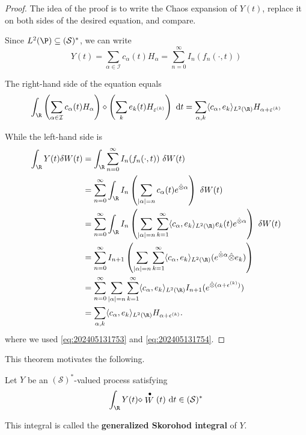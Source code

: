 \begin{proof}
The idea of the proof is to write the Chaos expansion of $Y(t)$, replace it on both sides of the desired equation, and compare.

Since $L^2(\P) \subseteq (\mathcal{S})^\ast$, we can write
\[
Y(t) = \sum_{\alpha \in \mathcal{I}} c_\alpha(t) H_\alpha = \sum_{n=0}^\infty I_n (f_n(\cdot, t))
\]

The right-hand side of the equation equals 
\[
\int_\R \left( \sum_{\alpha \in \mathcal{I}} c_\alpha(t) H_\alpha \right) \diamond \left( \sum_{k} e_k(t) H_{\varepsilon^{(k)}} \right) ~\mathrm{d}t = \sum_{\alpha, k} \langle c_\alpha, e_k \rangle_{L^2(\R)} H_{\alpha + \varepsilon^{(k)}}
\]

While the left-hand side is 
\begin{equation*}
\begin{aligned}
\int_{\R} Y(t) \delta W(t) & =\int_{\R} \sum_{n=0}^{\infty} I_n (f_n(\cdot, t)) ~\delta W(t) \\
& =\sum_{n=0}^{\infty} \int_{\R} I_n \left( \sum_{|\alpha| = n} c_\alpha(t) e^{\hat{\otimes} \alpha} \right) ~\delta W(t) \\
& =\sum_{n=0}^{\infty} \int_{\R} I_n \left(\sum_{|\alpha|=n} \sum_{k=1}^{\infty} \langle c_\alpha, e_k \rangle_{L^2(\R)} e_k(t) e^{\hat{\otimes} \alpha}\right) ~\delta W(t) \\
& =\sum_{n=0}^{\infty} I_{n+1}\left(\sum_{|\alpha|=n} \sum_{k=1}^{\infty} \langle c_\alpha, e_k \rangle_{L^2(\R)} (e^{\hat{\otimes} \alpha} \hat{\otimes} e_k)\right) \\
& =\sum_{n=0}^{\infty} \sum_{|\alpha|=n} \sum_{k=1}^{\infty} \langle c_\alpha, e_k \rangle_{L^2(\R)} I_{n+1} (e^{\hat{\otimes} (\alpha+\epsilon^{(k)})}) \\
& =\sum_{\alpha, k} \langle c_\alpha, e_k \rangle_{L^2(\R)} H_{\alpha+\epsilon^{(k)}} .
\end{aligned}
\end{equation*}
where we used \eqref{eq:202405131753} and \eqref{eq:202405131754}.
\end{proof}

This theorem motivates the following. 

\begin{definition}
Let $Y$ be an $(\mathcal{S})^\ast$-valued process satisfying
\[
\int_\R Y(t) \diamond \stackrel{\bullet}{W}(t) ~\mathrm{d}t \in (\mathcal{S})^\ast
\]

This integral is called the \textbf{generalized Skorohod integral} of $Y$.
\end{definition} 

%
%
%
%
%
%
%
%
